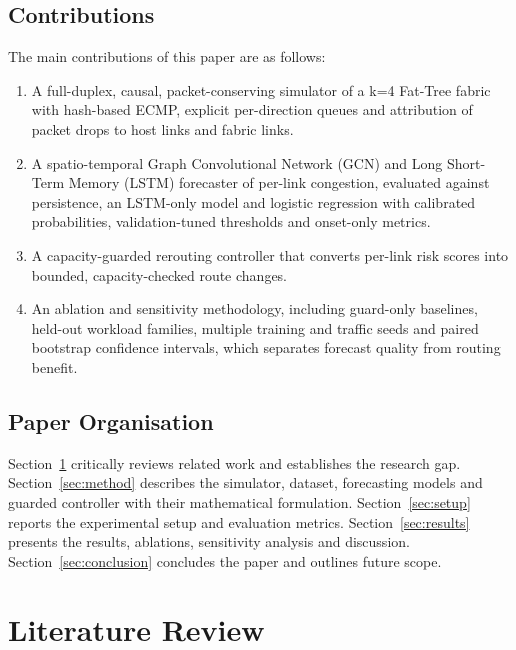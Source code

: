 \documentclass[conference]{IEEEtran}
\begin{document}
\subsection{Contributions}
The main contributions of this paper are as follows:
\begin{enumerate}
\item A full-duplex, causal, packet-conserving simulator of a k=4 Fat-Tree fabric with hash-based ECMP, explicit per-direction queues and attribution of packet drops to host links and fabric links.
\item A spatio-temporal Graph Convolutional Network (GCN) and Long Short-Term Memory (LSTM) forecaster of per-link congestion, evaluated against persistence, an LSTM-only model and logistic regression with calibrated probabilities, validation-tuned thresholds and onset-only metrics.
\item A capacity-guarded rerouting controller that converts per-link risk scores into bounded, capacity-checked route changes.
\item An ablation and sensitivity methodology, including guard-only baselines, held-out workload families, multiple training and traffic seeds and paired bootstrap confidence intervals, which separates forecast quality from routing benefit.
\end{enumerate}

\subsection{Paper Organisation}
Section~\ref{sec:lit} critically reviews related work and establishes the research gap. Section~\ref{sec:method} describes the simulator, dataset, forecasting models and guarded controller with their mathematical formulation. Section~\ref{sec:setup} reports the experimental setup and evaluation metrics. Section~\ref{sec:results} presents the results, ablations, sensitivity analysis and discussion. Section~\ref{sec:conclusion} concludes the paper and outlines future scope.

\section{Literature Review}
\label{sec:lit}
\end{document}
